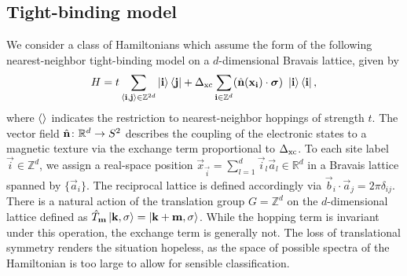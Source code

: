 \documentclass[
    10pt,
    aps,
    prb,
	longbibliography,
    twocolumn,
    floatfix,
    superscriptaddress,
]{revtex4-2}
\begin{document}
\subsection{Tight-binding model}
We consider a class of Hamiltonians which assume the form of the following nearest-neighbor tight-binding model on a $d$-dimensional Bravais lattice, given by
\begin{align}
    H  = t \sum_{\braket{\mathbf{i},\mathbf{j}} \in \mathbb{Z}^{2d}} \ket{\mathbf{i}}\bra{\mathbf{j}}
    + \Delta_\mathrm{xc}\sum_{\mathbf{i} \in \mathbb{Z}^d}  (\hat{\mathbf{n}} (\mathbf{x}_{\mathbf{i}}) \cdot \boldsymbol{\sigma}) ~ \ket{\mathbf{i}}\bra{\mathbf{i}} ,
    \label{eq:hamiltonian}
\end{align}
where $\braket{}$ indicates the restriction to nearest-neighbor hoppings of strength $t$.
The vector field $\hat{\mathbf{n}}\colon \mathbb{R}^d \to S^2$ describes the coupling of the electronic states to a magnetic texture via the exchange term proportional to $\Delta_\mathrm{xc}$. 
To each site label $\vec{i} \in \mathbb{Z}^d$, we assign a real-space position $\vec{x}_\vec{i} = \sum_{l=1}^d \vec{i}_l \vec{a}_l \in \mathbb{R}^d$ in a Bravais lattice spanned by $\lbrace \vec{a}_i \rbrace$. 
The reciprocal lattice is defined accordingly via $ \vec{b}_i \cdot \vec{a}_j  = 2\pi \delta_{ij}$.
There is a natural action of the translation group $G = \mathbb{Z}^d$ on the $d$-dimensional lattice defined as
$
    \hat{T}_{\mathbf{m}} \ket{\mathbf{k}, \sigma}  =  \ket{\mathbf{k}+ \mathbf{m}, \sigma}
$.
While the hopping term is invariant under this operation, the exchange term is generally not.
The loss of translational symmetry renders the situation hopeless, as the space of possible spectra of the Hamiltonian is too large to allow for sensible classification.
\end{document}
